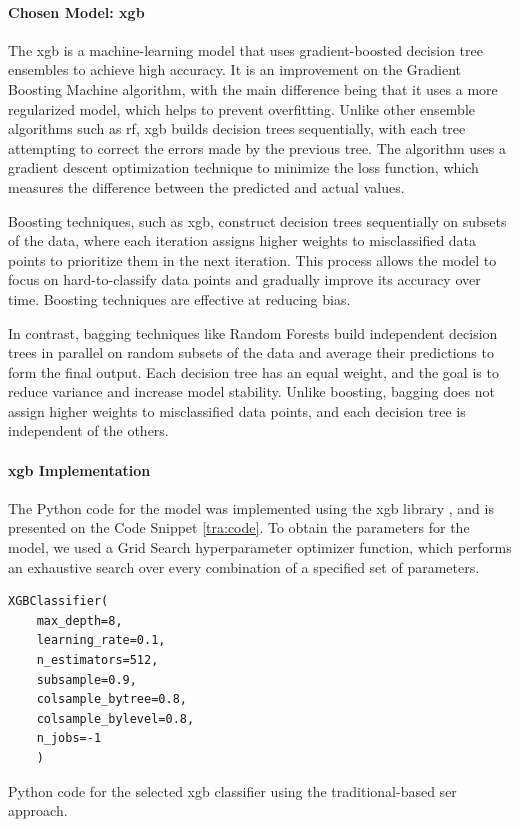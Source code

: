 \paragraph{Chosen Model: \acl{xgb}}

The \ac{xgb} is a machine-learning model that uses gradient-boosted decision tree ensembles to achieve high accuracy. It is an improvement on the Gradient Boosting Machine algorithm, with the main difference being that it uses a more regularized model, which helps to prevent overfitting. Unlike other ensemble algorithms such as \ac{rf}, \ac{xgb} builds decision trees sequentially, with each tree attempting to correct the errors made by the previous tree. The algorithm uses a gradient descent optimization technique to minimize the loss function, which measures the difference between the predicted and actual values.

Boosting techniques, such as \ac{xgb}, construct decision trees sequentially on subsets of the data, where each iteration assigns higher weights to misclassified data points to prioritize them in the next iteration. This process allows the model to focus on hard-to-classify data points and gradually improve its accuracy over time. Boosting techniques are effective at reducing bias.

In contrast, bagging techniques like Random Forests build independent decision trees in parallel on random subsets of the data and average their predictions to form the final output. Each decision tree has an equal weight, and the goal is to reduce variance and increase model stability. Unlike boosting, bagging does not assign higher weights to misclassified data points, and each decision tree is independent of the others.

\paragraph{\acl{xgb} Implementation}

The Python code for the model was implemented using the \ac{xgb} library \cite{xgboostchen}, and is presented on the Code Snippet \ref{tra:code}. To obtain the parameters for the model, we used a Grid Search hyperparameter optimizer function, which performs an exhaustive search over every combination of a specified set of parameters.

\begin{listing}[H]
	\begin{verbatim}
XGBClassifier(
	max_depth=8,
	learning_rate=0.1,
	n_estimators=512,
	subsample=0.9,
	colsample_bytree=0.8,
	colsample_bylevel=0.8,
	n_jobs=-1
	)
	\end{verbatim}
	\caption{Python code for the selected \ac{xgb} classifier using the traditional-based \ac{ser} approach.}
	\label{tra:code}
\end{listing}

